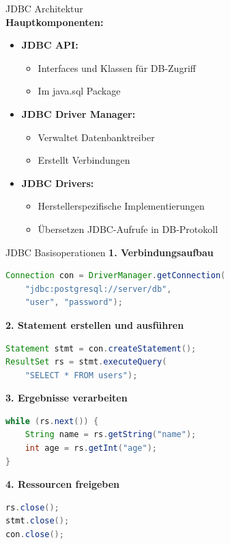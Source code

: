 \begin{concept}{JDBC Architektur}\\
\textbf{Hauptkomponenten:}
\begin{itemize}
    \item \textbf{JDBC API:} 
    \begin{itemize}
        \item Interfaces und Klassen für DB-Zugriff
        \item Im java.sql Package
    \end{itemize}
    \item \textbf{JDBC Driver Manager:}
    \begin{itemize}
        \item Verwaltet Datenbanktreiber
        \item Erstellt Verbindungen
    \end{itemize}
    \item \textbf{JDBC Drivers:}
    \begin{itemize}
        \item Herstellerspezifische Implementierungen
        \item Übersetzen JDBC-Aufrufe in DB-Protokoll
    \end{itemize}
\end{itemize}
\end{concept}

\begin{KR}{JDBC Basisoperationen}
\textbf{1. Verbindungsaufbau}
\begin{lstlisting}[language=Java, style=base]
Connection con = DriverManager.getConnection(
    "jdbc:postgresql://server/db",
    "user", "password");
\end{lstlisting}

\textbf{2. Statement erstellen und ausführen}
\begin{lstlisting}[language=Java, style=base]
Statement stmt = con.createStatement();
ResultSet rs = stmt.executeQuery(
    "SELECT * FROM users");
\end{lstlisting}

\textbf{3. Ergebnisse verarbeiten}
\begin{lstlisting}[language=Java, style=base]
while (rs.next()) {
    String name = rs.getString("name");
    int age = rs.getInt("age");
}
\end{lstlisting}

\textbf{4. Ressourcen freigeben}
\begin{lstlisting}[language=Java, style=base]
rs.close();
stmt.close();
con.close();
\end{lstlisting}
\end{KR}

